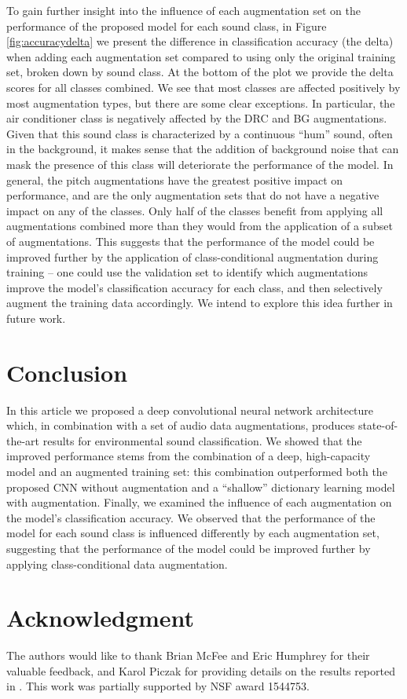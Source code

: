 \documentclass[journal,pdf]{IEEEtran}
\begin{document}
To gain further insight into the influence of each augmentation set on the performance of the proposed model for each sound class, in Figure \ref{fig:accuracydelta} we present the difference in classification accuracy (the delta) when adding each augmentation set compared to using only the original training set, broken down by sound class. At the bottom of the plot we provide the delta scores for all classes combined. We see that most classes are affected positively by most augmentation types, but there are some clear exceptions. In particular, the air conditioner class is negatively affected by the DRC and BG augmentations. Given that this sound class is characterized by a continuous ``hum'' sound, often in the background, it makes sense that the addition of background noise that can mask the presence of this class will deteriorate the performance of the model. 
In general, the pitch augmentations have the greatest positive impact on performance, and are the only augmentation sets that do not have a negative impact on any of the classes. Only half of the classes benefit from applying all augmentations combined more than they would from the application of a subset of augmentations. This suggests that the performance of the model could be improved further by the application of class-conditional augmentation during training -- one could use the validation set to identify which augmentations improve the model's classification accuracy for each class, and then selectively augment the training data accordingly. We intend to explore this idea further in future work.

\section{Conclusion}
\label{sec:conclusion}
In this article we proposed a deep convolutional neural network architecture which, in combination with a set of audio data augmentations, produces state-of-the-art results for environmental sound classification. We showed that the improved performance stems from the combination of a deep, high-capacity model and an augmented training set: this combination outperformed both the proposed CNN without augmentation and a ``shallow'' dictionary learning model with augmentation. Finally, we examined the influence of each augmentation on the model's classification accuracy. We observed that the performance of the model for each sound class is influenced differently by each augmentation set, suggesting that the performance of the model could be improved further by applying class-conditional data augmentation.

\section*{Acknowledgment}
The authors would like to thank Brian McFee and Eric Humphrey for their valuable feedback, and Karol Piczak for providing details on the results reported in \cite{Piczak:EnvSoundCNN:MLSP:15}.
This work was partially supported by NSF award 1544753.

\ifCLASSOPTIONcaptionsoff
  \newpage
\fi



\end{document}
